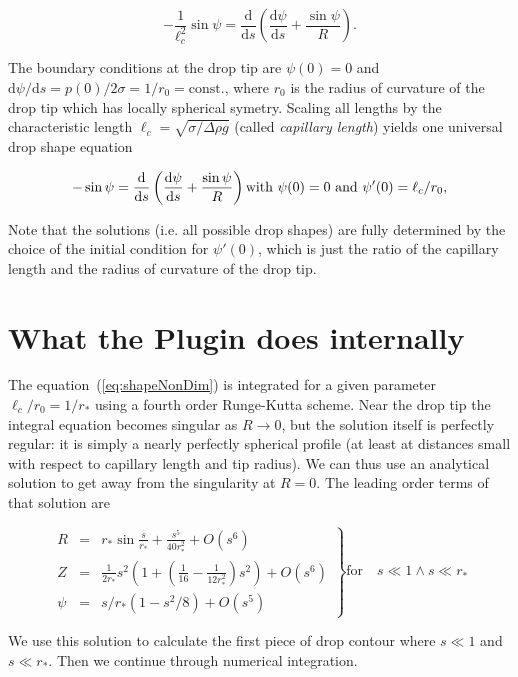 \documentclass[fleqn]{scrartcl}
\newcommand{\ud}{\mathrm{d}}%
\begin{document}
\[\label{eq:shape}
  - \frac{1}{\ell_c^2} \sin\psi =
  \frac{\ud}{\ud s}\left( \frac{\ud\psi}{\ud s} + \frac{\sin\psi}{R} \right).
\]

 The boundary conditions at the drop tip are $\psi(0)=0$ and $\ud\psi
/ \ud s = p(0)/2\sigma = 1/r_0 = \mathrm{const.}$, where $r_0$ is the
radius of curvature of the drop tip which has locally spherical
symetry. Scaling all lengths by the characteristic length $\ell_c =
\sqrt{\sigma/\Delta\!\rho g}$ (called \emph{capillary length}) yields
one universal drop shape equation

\begin{equation}\label{eq:shapeNonDim}
  - \sin\psi =
  \frac{\ud}{\ud s}\left( \frac{\ud\psi}{\ud s} + \frac{\sin\psi}{R} \right)\\
  \mbox{with } \psi(0)=0 \mbox{ and } \psi'(0) = \ell_c/r_0,
\end{equation}

Note that the solutions (i.e. all possible drop shapes) are fully
determined by the choice of the initial condition for $\psi'(0)$,
which is just the ratio of the capillary length and the radius of
curvature of the drop tip.

\section{What the Plugin does internally}
\label{sec:numerics}

The equation~(\ref{eq:shapeNonDim}) is integrated for a given parameter
$\ell_c/r_0 = 1/r_*$ using a fourth order Runge-Kutta scheme. Near the
drop tip the integral equation becomes singular as $R\to 0$, but the
solution itself is perfectly regular: it is simply a nearly perfectly
spherical profile (at least at distances small with respect to
capillary length and tip radius). We can thus use an analytical
solution to get away from the singularity at $R=0$. The leading order
terms of that solution are

\[
\left.%
\begin{array}{lll}
R & = & r_*\sin\frac{s}{r_*} + \frac{s^5}{40 r_*^2} + O(s^6) \\
Z & = & \frac{1}{2r_*} s^2 (1 + (\frac{1}{16} - \frac{1}{12r_*^2}) s^2) + O(s^6)\\
\psi & = & s/r_* (1-s^2/8) + O(s^5)
\end{array}\right\}
\mathrm{for}\quad s \ll 1 \wedge s \ll r_*
\]

We use this solution to calculate the first piece of drop contour
where $s \ll 1$ and $s \ll r_*$. Then we continue through numerical
integration.
\end{document}
